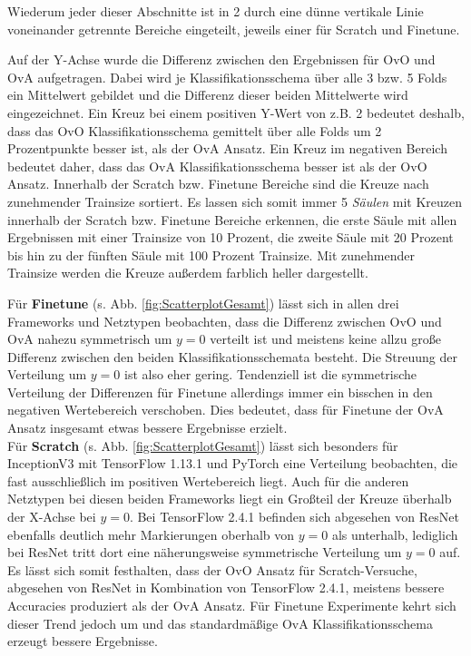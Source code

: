 Wiederum jeder dieser Abschnitte ist in 2 durch eine dünne vertikale Linie voneinander getrennte Bereiche eingeteilt, jeweils einer für Scratch und Finetune.

Auf der Y-Achse wurde die Differenz zwischen den Ergebnissen für OvO und OvA aufgetragen. Dabei wird je Klassifikationsschema über alle 3 bzw. 5 Folds ein Mittelwert gebildet und die Differenz dieser beiden Mittelwerte wird eingezeichnet. Ein Kreuz bei einem positiven Y-Wert von z.B. 2 bedeutet deshalb, dass das OvO Klassifikationsschema gemittelt über alle Folds um 2 Prozentpunkte besser ist, als der OvA Ansatz. Ein Kreuz im negativen Bereich bedeutet daher, dass das OvA Klassifikationsschema besser ist als der OvO Ansatz.
Innerhalb der Scratch bzw. Finetune Bereiche sind die Kreuze nach zunehmender Trainsize sortiert. Es lassen sich somit immer 5 \textit{Säulen} mit Kreuzen innerhalb der Scratch bzw. Finetune Bereiche erkennen, die erste Säule mit allen Ergebnissen mit einer Trainsize von 10 Prozent, die zweite Säule mit 20 Prozent bis hin zu der fünften Säule mit 100 Prozent Trainsize. Mit zunehmender Trainsize werden die Kreuze außerdem farblich heller dargestellt.


Für \textbf{Finetune} (s. Abb. \ref{fig:ScatterplotGesamt}) lässt sich in allen drei Frameworks und Netztypen beobachten, dass die Differenz zwischen OvO und OvA nahezu symmetrisch um $y=0$ verteilt ist und meistens keine allzu große Differenz zwischen den beiden Klassifikationsschemata besteht. Die Streuung der Verteilung um $y=0$ ist also eher gering.
Tendenziell ist die symmetrische Verteilung der Differenzen für Finetune allerdings immer ein bisschen in den negativen Wertebereich verschoben. Dies bedeutet, dass für Finetune der OvA Ansatz insgesamt etwas bessere Ergebnisse erzielt.\\

Für \textbf{Scratch} (s. Abb. \ref{fig:ScatterplotGesamt}) lässt sich besonders für InceptionV3 mit TensorFlow \cite{tensorflow} 1.13.1 und PyTorch eine Verteilung beobachten, die fast ausschließlich im positiven Wertebereich liegt. Auch für die anderen Netztypen bei diesen beiden Frameworks liegt ein Großteil der Kreuze überhalb der X-Achse bei $y=0$. Bei TensorFlow \cite{tensorflow} 2.4.1 befinden sich abgesehen von ResNet ebenfalls deutlich mehr Markierungen oberhalb von $y=0$ als unterhalb, lediglich bei ResNet tritt dort eine näherungsweise symmetrische Verteilung um $y=0$ auf.\\

Es lässt sich somit festhalten, dass der OvO Ansatz für Scratch-Versuche, abgesehen von ResNet in Kombination von TensorFlow \cite{tensorflow} 2.4.1, meistens bessere Accuracies produziert als der OvA Ansatz. Für Finetune Experimente kehrt sich dieser Trend jedoch um und das standardmäßige OvA Klassifikationsschema erzeugt bessere Ergebnisse.

